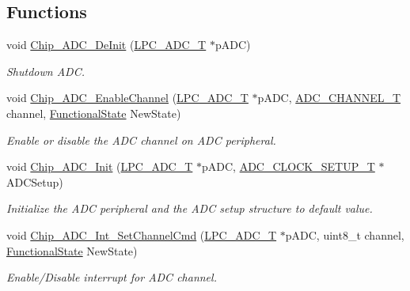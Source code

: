 \subsection*{Functions}
\begin{DoxyCompactItemize}
\item 
void \hyperlink{group__ADC__17XX__40XX_ga749cff51066bd49acaca0497d78f3332}{Chip\+\_\+\+A\+D\+C\+\_\+\+De\+Init} (\hyperlink{structLPC__ADC__T}{L\+P\+C\+\_\+\+A\+D\+C\+\_\+T} $\ast$p\+A\+DC)
\begin{DoxyCompactList}\small\item\em Shutdown A\+DC. \end{DoxyCompactList}\item 
void \hyperlink{group__ADC__17XX__40XX_gaf2fd510be97c2747ed3c53c132a45e15}{Chip\+\_\+\+A\+D\+C\+\_\+\+Enable\+Channel} (\hyperlink{structLPC__ADC__T}{L\+P\+C\+\_\+\+A\+D\+C\+\_\+T} $\ast$p\+A\+DC, \hyperlink{group__ADC__17XX__40XX_ga30ee7058bc7cc1daff718b29b42bed4e}{A\+D\+C\+\_\+\+C\+H\+A\+N\+N\+E\+L\+\_\+T} channel, \hyperlink{group__LPC__Types__Public__Types_gac9a7e9a35d2513ec15c3b537aaa4fba1}{Functional\+State} New\+State)
\begin{DoxyCompactList}\small\item\em Enable or disable the A\+DC channel on A\+DC peripheral. \end{DoxyCompactList}\item 
void \hyperlink{group__ADC__17XX__40XX_ga459b17621657a66281f2bc9baae3626c}{Chip\+\_\+\+A\+D\+C\+\_\+\+Init} (\hyperlink{structLPC__ADC__T}{L\+P\+C\+\_\+\+A\+D\+C\+\_\+T} $\ast$p\+A\+DC, \hyperlink{structADC__CLOCK__SETUP__T}{A\+D\+C\+\_\+\+C\+L\+O\+C\+K\+\_\+\+S\+E\+T\+U\+P\+\_\+T} $\ast$A\+D\+C\+Setup)
\begin{DoxyCompactList}\small\item\em Initialize the A\+DC peripheral and the A\+DC setup structure to default value. \end{DoxyCompactList}\item 
void \hyperlink{group__ADC__17XX__40XX_gac0bf9a8d016bcd88866d4ae59b1ca78c}{Chip\+\_\+\+A\+D\+C\+\_\+\+Int\+\_\+\+Set\+Channel\+Cmd} (\hyperlink{structLPC__ADC__T}{L\+P\+C\+\_\+\+A\+D\+C\+\_\+T} $\ast$p\+A\+DC, uint8\+\_\+t channel, \hyperlink{group__LPC__Types__Public__Types_gac9a7e9a35d2513ec15c3b537aaa4fba1}{Functional\+State} New\+State)
\begin{DoxyCompactList}\small\item\em Enable/\+Disable interrupt for A\+DC channel. \end{DoxyCompactList}\item 

\end{DoxyCompactItemize}
